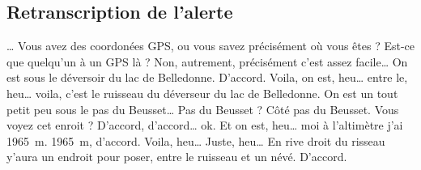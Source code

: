 \subsection{Retranscription de l'alerte}
\begin{dialogue}
  \Sec {}…  Vous avez des
  coordonées GPS, ou vous savez précisément où vous êtes ?  \Req
   Est-ce que quelqu'un à un GPS
  là ? Non, autrement, précisément c'est assez facile… On est sous le
  déversoir du lac de Belledonne.  \Sec D'accord.  \Req Voila, on est,
  heu… entre le, heu… voila, c'est le ruisseau du déverseur du lac de
  Belledonne. On est un tout petit peu sous le pas du Beusset…  \Sec
  Pas du Beusset ?  \Req Côté pas du Beusset. Vous voyez cet enroit ?
  \Sec D'accord, d'accord… ok.  \Req Et on est, heu… moi à l'altimètre
  j'ai \SI{1965}{\meter}.  \Sec \SI{1965}{\meter}, d'accord.  \Req
  Voila, heu… Juste, heu… En rive droit du risseau y'aura un endroit
  pour poser, entre le ruisseau et un névé.  \Sec
  D'accord. 
\end{dialogue}
